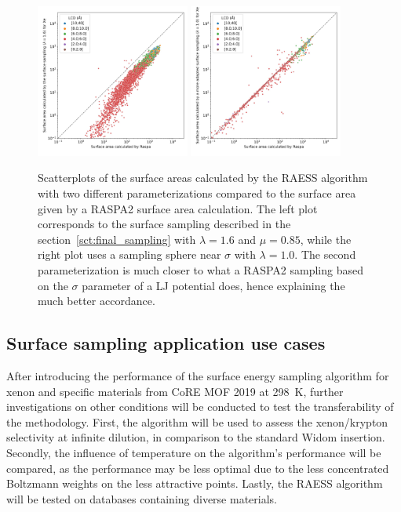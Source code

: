 \documentclass[main]{subfiles}
\begin{document}
\begin{figure}[ht]
  \centering
  \includegraphics[width=0.45\textwidth]{figures/3-fastsim/SA_raspa_Xe_m3_cm3_vs_SA_lambda_1.6_overview.jpg}
  \hfill
  \includegraphics[width=0.45\textwidth]{figures/3-fastsim/SA_raspa_Xe_m3_cm3_vs_SA_lambda_1.0_overview.jpg}
  \caption{Scatterplots of the surface areas calculated by the RAESS algorithm with two different parameterizations compared to the surface area given by a RASPA2 surface area calculation. The left plot corresponds to the surface sampling described in the section~\ref{sct:final_sampling} with $\lambda=1.6$ and $\mu=0.85$, while the right plot uses a sampling sphere near $\sigma$ with $\lambda=1.0$. The second parameterization is much closer to what a RASPA2 sampling based on the $\sigma$ parameter of a LJ potential does, hence explaining the much better accordance. }\label{fgr:surface_area}
\end{figure}

\subsection{Surface sampling application use cases}

After introducing the performance of the surface energy sampling algorithm for xenon and specific materials from CoRE MOF 2019 at \SI{298}{\kelvin}, further investigations on other conditions will be conducted to test the transferability of the methodology. First, the algorithm will be used to assess the xenon/krypton selectivity at infinite dilution, in comparison to the standard Widom insertion. Secondly, the influence of temperature on the algorithm's performance will be compared, as the performance may be less optimal due to the less concentrated Boltzmann weights on the less attractive points. Lastly, the RAESS algorithm will be tested on databases containing diverse materials.
\end{document}
